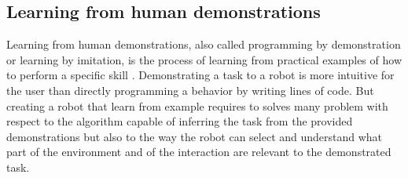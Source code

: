 \subsection{Learning from human demonstrations}

Learning from human demonstrations, also called programming by demonstration or learning by imitation, is the process of learning from practical examples of how to perform a specific skill \cite{schaal1999imitation,argall09survey,lopes10imitationchapter}. Demonstrating a task to a robot is more intuitive for the user than directly programming a behavior by writing lines of code. But creating a robot that learn from example requires to solves many problem with respect to the algorithm capable of inferring the task from the provided demonstrations but also to the way the robot can select and understand what part of the environment and of the interaction are relevant to the demonstrated task.

